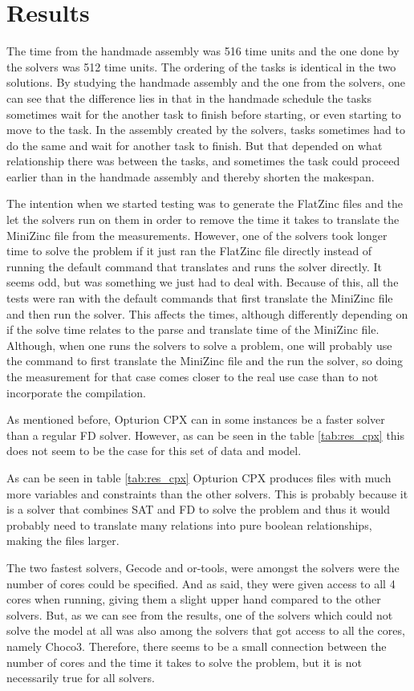 \section{Results}
The time from the handmade assembly was 516 time units and the one done by the solvers was 512 time units. The ordering of the tasks is identical in the two solutions. By studying the handmade assembly and the one from the solvers, one can see that the difference lies in that in the handmade schedule the tasks sometimes wait for the another task to finish before starting, or even starting to move to the task. In the assembly created by the solvers, tasks sometimes had to do the same and wait for another task to finish. But that depended on what relationship there was between the tasks, and sometimes the task could proceed earlier than in the handmade assembly and thereby shorten the makespan.

The intention when we started testing was to generate the FlatZinc files and the let the solvers run on them in order to remove the time it takes to translate the MiniZinc file from the measurements. However, one of the solvers took longer time to solve the problem if it just ran the FlatZinc file directly instead of running the default command that translates and runs the solver directly. It seems odd, but was something we just had to deal with. Because of this, all the tests were ran with the default commands that first translate the MiniZinc file and then run the solver. This affects the times, although differently depending on if the solve time relates to the parse and translate time of the MiniZinc file. Although, when one runs the solvers to solve a problem, one will probably use the command to first translate the MiniZinc file and the run the solver, so doing the measurement for that case comes closer to the real use case than to not incorporate the compilation.

As mentioned before, Opturion CPX can in some instances be a faster solver than a regular FD solver. However, as can be seen in the table \ref{tab:res_cpx} this does not seem to be the case for this set of data and model.

As can be seen in table \ref{tab:res_cpx} Opturion CPX produces files with much more variables and constraints than the other solvers. This is probably because it is a solver that combines SAT and FD to solve the problem and thus it would probably need to translate many relations into pure boolean relationships, making the files larger.

The two fastest solvers, Gecode and or-tools, were amongst the solvers were the number of cores could be specified. And as said, they were given access to all 4 cores when running, giving them a slight upper hand compared to the other solvers. But, as we can see from the results, one of the solvers which could not solve the model at all was also among the solvers that got access to all the cores, namely Choco3. Therefore, there seems to be a small connection between the number of cores and the time it takes to solve the problem, but it is not necessarily true for all solvers.

